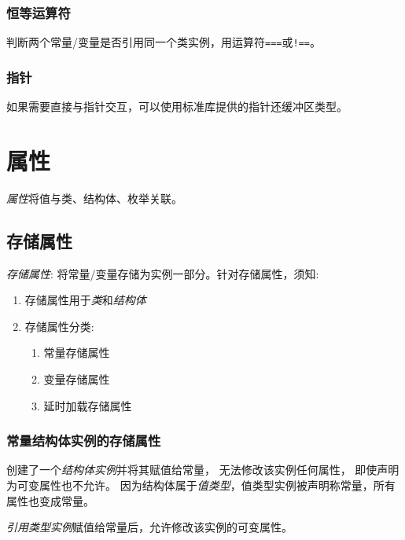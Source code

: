 \documentclass{../main.tex}{subfiles}
\begin{document}
\subsubsection{恒等运算符}
判断两个常量/变量是否引用同一个类实例，用运算符\lstinline{===}或\lstinline{!==}。

\subsubsection{指针}
如果需要直接与指针交互，可以使用标准库提供的指针还缓冲区类型。


\section{属性}
\emph{属性}将值与类、结构体、枚举关联。



\subsection{存储属性}
\emph{存储属性}: 将常量/变量存储为实例一部分。针对存储属性，须知:
\begin{enumerate}[itemsep=0pt, parsep=0pt, topsep=0pt, partopsep=0pt]
    \item 存储属性用于\emph{类}和\emph{结构体}
    \item 存储属性分类:
        \begin{enumerate}[itemsep=0pt, parsep=0pt, topsep=0pt, partopsep=0pt]
            \item 常量存储属性
            \item 变量存储属性
            \item 延时加载存储属性
        \end{enumerate}
\end{enumerate}

\subsubsection{常量结构体实例的存储属性}
创建了一个\emph{结构体实例}并将其赋值给常量，
    无法修改该实例任何属性，
    即使声明为可变属性也不允许。
因为结构体属于\emph{值类型}，值类型实例被声明称常量，所有属性也变成常量。

\emph{引用类型实例}赋值给常量后，允许修改该实例的可变属性。
\end{document}
